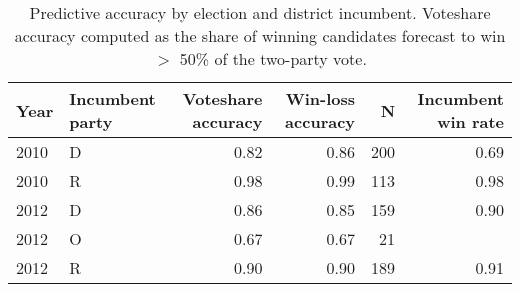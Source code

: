 \begin{table*}[ht]
\centering
\begin{tabular}{llrrrr}
  \hline
Year & Incumbent party & Voteshare accuracy & Win-loss accuracy & N & Incumbent win rate \\ 
  \hline
2010 & D & 0.82 & 0.86 & 200 & 0.69 \\ 
  2010 & R & 0.98 & 0.99 & 113 & 0.98 \\ 
  2012 & D & 0.86 & 0.85 & 159 & 0.90 \\ 
  2012 & O & 0.67 & 0.67 & 21 &  \\ 
  2012 & R & 0.90 & 0.90 & 189 & 0.91 \\ 
   \hline
\end{tabular}
\caption{Predictive accuracy by election and district
  incumbent. Voteshare accuracy computed as the share of winning candidates
  forecast to win $>$ 50\% of the two-party vote.} 
\label{tab:accuracy-by-incumbency}
\end{table*}
